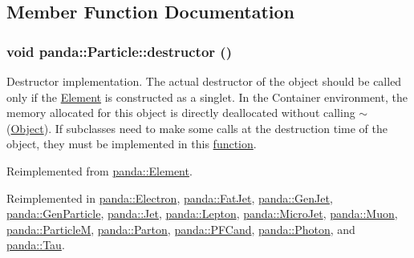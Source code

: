 \subsection{Member Function Documentation}
\hypertarget{classpanda_1_1Particle_ad1a5f606b804ac2ec5d7e391aba6bda6}{
\subsubsection[{destructor}]{\setlength{\rightskip}{0pt plus 5cm}void panda::Particle::destructor ()}}
\label{classpanda_1_1Particle_ad1a5f606b804ac2ec5d7e391aba6bda6}


Destructor implementation. The actual destructor of the object should be called only if the \hyperlink{classpanda_1_1Element}{Element} is constructed as a singlet. In the Container environment, the memory allocated for this object is directly deallocated without calling $\sim$(\hyperlink{classpanda_1_1Object}{Object}). If subclasses need to make some calls at the destruction time of the object, they must be implemented in this \hyperlink{namespacepanda_1_1function}{function}. 

Reimplemented from \hyperlink{classpanda_1_1Element_a7ce6bca6d7422aac78576742dc67f0b8}{panda::Element}.

Reimplemented in \hyperlink{classpanda_1_1Electron_a9e9a34d904d5cc02ab895e73cdaf6d7f}{panda::Electron}, \hyperlink{classpanda_1_1FatJet_a421049d4b4315facb5bda39746f1a38b}{panda::FatJet}, \hyperlink{classpanda_1_1GenJet_a4a10379464d97681df56ba78c59d9ec9}{panda::GenJet}, \hyperlink{classpanda_1_1GenParticle_a3741159cb9918fc4a7bf714995d72469}{panda::GenParticle}, \hyperlink{classpanda_1_1Jet_adbd430a93e346588348e1eebaa90c42a}{panda::Jet}, \hyperlink{classpanda_1_1Lepton_af8bb4d531bdddbf51f479f7eb0dae175}{panda::Lepton}, \hyperlink{classpanda_1_1MicroJet_a89f2dbacfc1c34c4f34185ea305f8797}{panda::MicroJet}, \hyperlink{classpanda_1_1Muon_aa982002bedb53cacab127270c53e54e8}{panda::Muon}, \hyperlink{classpanda_1_1ParticleM_abef15d28e6e33ee92c0b318bd41af2ca}{panda::ParticleM}, \hyperlink{classpanda_1_1Parton_a54783d8795081067290078d39305e21c}{panda::Parton}, \hyperlink{classpanda_1_1PFCand_a30a87718470988f020ce75d7e990868b}{panda::PFCand}, \hyperlink{classpanda_1_1Photon_a03611f9014bd137d9aa651ac938575c7}{panda::Photon}, and \hyperlink{classpanda_1_1Tau_a7caf1a64e1c468e27a6a88c34ab97457}{panda::Tau}.


